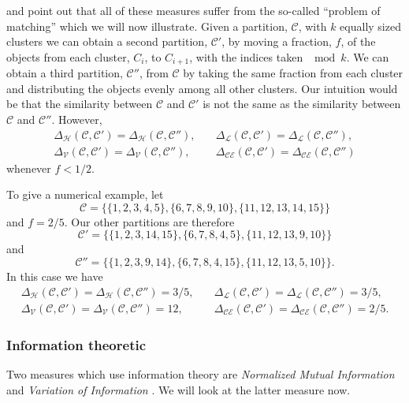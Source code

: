 \documentclass[a4paper]{report}
\newcommand{\clus}{\mathcal{C}}
\newcommand{\partcomparep}[1]{\Delta_{\mathcal{#1}}(\clus,\clus')}
\newcommand{\partcomparepp}[1]{\Delta_{\mathcal{#1}}(\clus,\clus'')}
\begin{document}
\citet{meila-2007} and \citet{bae2010comparison} point out that all of these
measures suffer from the so-called ``problem of matching'' which we will now
illustrate.  Given a partition, $\clus$, with $k$ equally sized clusters we
can obtain a second partition, $\clus'$, by moving a fraction, $f$, of the
objects from each cluster, $C_{i}$, to $C_{i+1}$, with the indices taken $\mod
k$.  We can obtain a third partition, $\clus''$, from $\clus$ by taking the
same fraction from each cluster and distributing the objects evenly among all
other clusters.  Our intuition would be that the similarity between $\clus$
and $\clus'$ is not the same as the similarity between $\clus$ and $\clus''$.
However,
\begin{align*}
  \partcomparep{H} = \partcomparepp{H},&\quad
  \partcomparep{L} = \partcomparepp{L},\\
  \partcomparep{V} = \partcomparepp{V},&\quad
  \partcomparep{CE} = \partcomparepp{CE}
\end{align*}
whenever $f < 1/2$.

To give a numerical example, let
\begin{equation*}
  \clus = \{\{1,2,3,4,5\},\{6,7,8,9,10\},\{11,12,13,14,15\}\}
\end{equation*}
and $f = 2/5$.  Our other partitions are therefore
\begin{equation*}
\clus' = \{\{1,2,3,14,15\},\{6,7,8,4,5\},\{11,12,13,9,10\}\}
\end{equation*}
and
\begin{equation*}
\clus'' = \{\{1,2,3,9,14\},\{6,7,8,4,15\},\{11,12,13,5,10\}\}.
\end{equation*}
In this case we have
\begin{align*}
  \partcomparep{H} = \partcomparepp{H} = 3/5,&\quad
  \partcomparep{L} = \partcomparepp{L} = 3/5,\\
  \partcomparep{V} = \partcomparepp{V} = 12,&\quad
  \partcomparep{CE} = \partcomparepp{CE} = 2/5.
\end{align*}

\subsubsection{Information theoretic}
\label{sec:inform-theor}

Two measures which use information theory are \textit{Normalized Mutual
  Information} \citep{fred-jain-2003} and \textit{Variation of Information}
\citep{meila-2007}.  We will look at the latter measure now.
\end{document}
